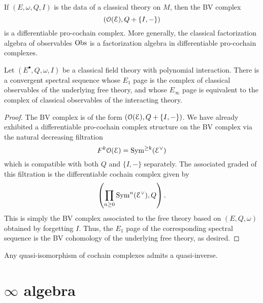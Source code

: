\documentclass[10pt, oneside]{article}
\begin{document}
\begin{lem}
If $(E, \omega, Q, I)$ is the data of a classical theory on $M$, then the BV complex
\[
\left(\mathcal O(\mathcal E) , Q + \{I,-\}\right)
\]
is a differentiable pro-cochain complex.
More generally, the classical factorization algebra of observables $\mathrm{Obs}$ is a factorization algebra in differentiable pro-cochain complexes. 
\end{lem}

\begin{lemma} \label{free_int_ss_lemma}
Let $(E^\bullet, Q, \omega, I)$ be a classical field theory with polynomial interaction.  There is a convergent spectral sequence whose $E_1$ page is the complex of classical observables of the underlying free theory, and whose $E_\infty$ page is equivalent to the complex of classical observables of the interacting theory.
\end{lemma}
\begin{proof}
The BV complex is of the form $\left(\mathcal O(\mathcal E), Q + \{I,-\}\right)$.
We have already exhibited  a differentiable pro-cochain complex structure on the BV complex via the 
natural decreasing filtration 
\[
F^k \mathcal O (\mathcal E) = {\rm Sym}^{\geq k} (\mathcal E^\vee)
\]
which is compatible with both $Q$ and $\{I,-\}$ separately.
The associated graded of this filtration is the differentiable cochain complex given by
\[
\left(\prod_{n \geq 0} {\rm Sym}^n (\mathcal E^\vee) , Q \right) .
\]
This is simply the BV complex associated to the free theory based on $(E, Q, \omega)$ obtained by forgetting $I$. 
Thus, the $E_1$ page of the corresponding spectral sequence is the BV cohomology of the underlying free theory, as desired. 
 
\end{proof}

\begin{lemma} \label{invert_quis_lemma}
Any quasi-isomorphism of cochain complexes admits a quasi-inverse.
\end{lemma}

\section{$\infty$ algebra}

\end{document}
